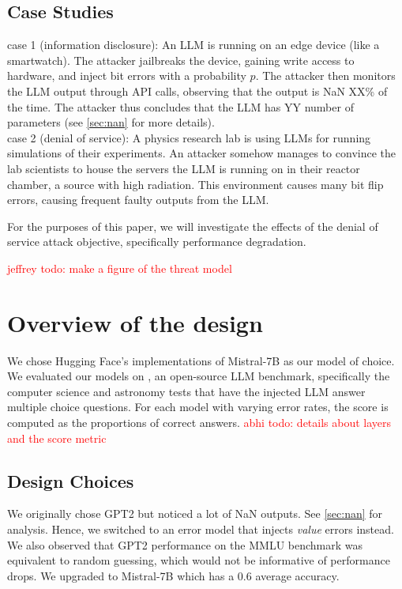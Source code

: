 \subsection{Case Studies}
case 1 (information disclosure): An LLM is running on an edge device (like a smartwatch). The attacker jailbreaks the device, gaining write access to hardware, and inject bit errors with a probability $p$. The attacker then monitors the LLM output through API calls, observing that the output is NaN XX\% of the time. The attacker thus concludes that the LLM has YY number of parameters (see \ref{sec:nan} for more details). \\

case 2 (denial of service): A physics research lab is using LLMs for running simulations of their experiments. An attacker somehow manages to convince the lab scientists to house the servers the LLM is running on in their reactor chamber, a source with high radiation. This environment causes many bit flip errors, causing frequent faulty outputs from the LLM.

For the purposes of this paper, we will investigate the effects of the denial of service attack objective, specifically performance degradation.


\textcolor{red}{jeffrey todo: make a figure of the threat model}



\section{Overview of the design}
\label{sec:overview}

We chose Hugging Face's implementations of Mistral-7B \cite{mistral7b} as our model of choice. We evaluated our models on \cite{DeepEval}, an open-source LLM benchmark, specifically the computer science and astronomy tests that have the injected LLM answer multiple choice questions. For each model with varying error rates, the score is computed as the proportions of correct answers. \textcolor{red}{abhi todo: details about layers and the score metric}

\subsection{Design Choices}
We originally chose GPT2 but noticed a lot of NaN outputs. See \ref{sec:nan} for analysis. Hence, we switched to an error model that injects \textit{value} errors instead. \\

We also observed that GPT2 performance on the MMLU benchmark was equivalent to random guessing, which would not be informative of performance drops. We upgraded to Mistral-7B which has a 0.6 average accuracy.